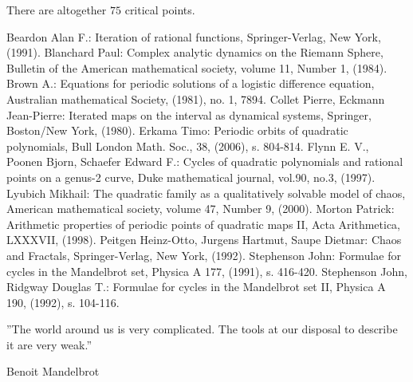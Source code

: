 \documentclass[12pt,a4paper]{amsart}
\numberwithin{equation}{section}
\numberwithin{lause}{section}
\begin{document}
There are altogether $75$ critical points.












\begin{thebibliography}{24}
 Beardon Alan F.: Iteration of rational functions, Springer-Verlag, New York, (1991).
 Blanchard Paul: Complex analytic dynamics on the Riemann Sphere, Bulletin of the American mathematical society, volume 11, Number 1, (1984).
 Brown A.: Equations for periodic solutions of a logistic difference equation, Australian mat\-he\-ma\-ti\-cal Society, (1981), no. 1, 7894.
 Collet Pierre, Eckmann Jean-Pierre: Iterated maps on the interval as dynamical systems, Springer, Boston/New York, (1980).
 Erkama Timo: Periodic orbits of quadratic polynomials, Bull London Math. Soc., 38, (2006), s. 804-814.
 Flynn E. V., Poonen Bjorn, Schaefer Edward F.: Cycles of quadratic polynomials and rational points on a genus-2 curve, Duke mathematical journal, vol.90, no.3, (1997).
 Lyubich Mikhail: The quadratic family as a qualitatively solvable model of chaos, American mathematical society, volume 47, Number 9, (2000).
 Morton Patrick: Arithmetic properties of periodic points of quadratic maps II, Acta Arithmetica, LXXXVII, (1998).
 Peitgen Heinz-Otto, Jurgens Hartmut, Saupe Dietmar: Chaos and Fractals, Springer-Verlag, New York, (1992).
 Stephenson John: Formulae for cycles in the Mandelbrot set, Physica A 177, (1991), s. 416-420.
 Stephenson John, Ridgway Douglas T.: Formulae for cycles in the Mandelbrot set II, Physica A 190, (1992), s. 104-116.



\end{thebibliography}
\vspace*{0.1cm}
\begin{center}
''The world around us is very complicated. The tools at our
disposal to describe it are very weak.''
\end{center}
\vspace*{0.1cm}
\begin{center}
Benoit Mandelbrot
\end{center}
\end{document}
